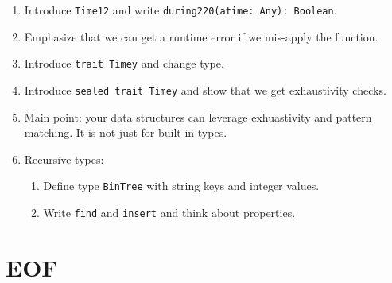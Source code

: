 \documentclass[9pt]{extbook}
\begin{document}
\begin{enumerate}
  \item Introduce \lstinline|Time12| and write \lstinline|during220(atime: Any): Boolean|.

  \item Emphasize that we can get a runtime error if we mis-apply the function.

  \item Introduce \lstinline|trait Timey| and change type.

  \item Introduce \lstinline|sealed trait Timey| and show that we get exhaustivity checks.

  \item Main point: your data structures can leverage
  exhuastivity and pattern matching. It is not just for built-in
  types.

  \item Recursive types:

  \begin{enumerate}

  \item Define type \lstinline|BinTree| with string keys and integer values.

  \item Write \lstinline|find| and \lstinline|insert| and think about properties.

  \end{enumerate}

 
\end{enumerate}

\chapter{EOF}
\end{document}

